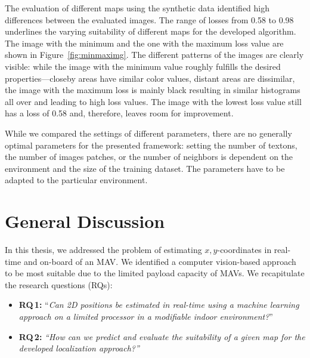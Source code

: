 \documentclass[11pt]{report}
\begin{document}
The evaluation of different maps using the synthetic data identified
high differences between the evaluated images. The range of losses
from 0.58 to 0.98 underlines the varying suitability of different maps
for the developed algorithm.
The image with the minimum and the one with the maximum loss value are
shown in Figure~\ref{fig:minmaximg}. The different patterns of the
images are clearly visible: while the image with the minimum value
roughly fulfills the desired properties---closeby areas have similar
color values, distant areas are dissimilar, the image with the maximum
loss is mainly black resulting in similar histograms all over and
leading to high loss values. The image with the lowest loss value
still has a loss of 0.58 and, therefore, leaves room for improvement.

While we compared the settings of different parameters, there are no
generally optimal parameters for the presented framework: setting the
number of textons, the number of images patches, or the number of
neighbors is dependent on the environment and the size of the training
dataset. The parameters have to be adapted to the particular
environment.

\section{General Discussion}
\label{sec:generaldiscussion}

In this thesis, we addressed the problem of estimating
$x,y$-coordinates in real-time and on-board of an MAV. We identified a
computer vision-based approach to be most suitable due to the limited
payload capacity of MAVs. We recapitulate the research questions
(RQs):

\begin{itemize}
\item \textbf{RQ\,1:} ``\emph{Can 2D positions be estimated in real-time using a
    machine learning approach on a limited processor in a modifiable
    indoor environment?}''
\item \textbf{RQ\,2:} \emph{``How can we predict and evaluate the suitability of a
    given map for the developed localization approach?''} 
\end{itemize}
\end{document}
